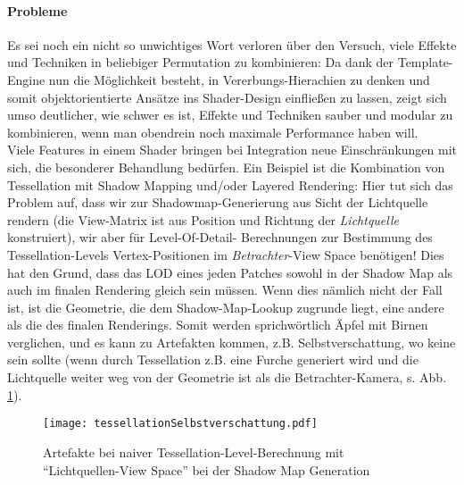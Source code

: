 	\paragraph{Probleme}
	\label{par:ShaderManager:Problems}
	Es sei noch ein nicht so unwichtiges Wort verloren über den Versuch, viele Effekte und Techniken in beliebiger
	Permutation zu kombinieren: Da dank der Template-Engine nun die Möglichkeit besteht, in Vererbungs-Hierachien zu denken
	und somit objektorientierte Ansätze ins Shader-Design einfließen zu lassen, zeigt sich umso deutlicher,
	wie schwer es ist, Effekte und Techniken sauber und modular zu kombinieren, wenn man obendrein noch maximale
	Performance haben will.\\
	Viele Features in einem Shader bringen bei Integration neue Einschränkungen mit sich, 
	die besonderer Behandlung bedürfen.
	Ein Beispiel ist die Kombination von Tessellation mit Shadow Mapping und/oder Layered Rendering: 
	Hier tut sich das Problem auf, dass wir zur Shadowmap-Generierung aus Sicht der Lichtquelle rendern 
	(die View-Matrix ist aus Position und Richtung der \emph{Lichtquelle} konstruiert), wir aber für Level-Of-Detail-	
	Berechnungen zur Bestimmung des Tessellation-Levels	Vertex-Positionen im \emph{Betrachter}-View Space benötigen!
	Dies hat den Grund, dass das LOD eines jeden Patches sowohl in der Shadow Map als auch im finalen Rendering
	gleich sein müssen. Wenn dies nämlich nicht der Fall ist, ist die Geometrie, die dem Shadow-Map-Lookup
	zugrunde liegt, eine andere als die des finalen Renderings. Somit werden sprichwörtlich Äpfel mit Birnen verglichen,
	und es kann zu Artefakten kommen, z.B. Selbstverschattung, wo keine sein sollte (wenn durch Tessellation z.B.
	eine Furche generiert wird und die Lichtquelle weiter weg von der Geometrie ist als die Betrachter-Kamera, 
	s. Abb. \ref{fig:tessellationSelbstverschattung}).
	
	\begin{figure}[!h]
		\texttt{[image: tessellationSelbstverschattung.pdf]}
		\caption{Artefakte bei naiver Tessellation-Level-Berechnung mit 
		"`Lichtquellen-View Space"' bei der Shadow Map Generation}
		\label{fig:tessellationSelbstverschattung}
	\end{figure}
	
